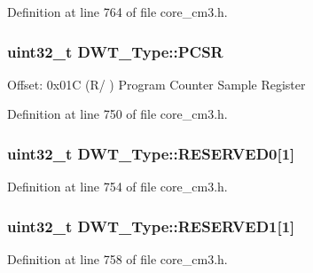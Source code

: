 Definition at line 764 of file core\+\_\+cm3.\+h.

\subsubsection[{\texorpdfstring{P\+C\+SR}{PCSR}}]{ uint32\+\_\+t D\+W\+T\+\_\+\+Type\+::\+P\+C\+SR}\hypertarget{structDWT__Type_abc5ae11d98da0ad5531a5e979a3c2ab5}{}\label{structDWT__Type_abc5ae11d98da0ad5531a5e979a3c2ab5}
Offset\+: 0x01C (R/ ) Program Counter Sample Register 

Definition at line 750 of file core\+\_\+cm3.\+h.

\subsubsection[{\texorpdfstring{R\+E\+S\+E\+R\+V\+E\+D0}{RESERVED0}}]{\setlength{\rightskip}{0pt plus 5cm}uint32\+\_\+t D\+W\+T\+\_\+\+Type\+::\+R\+E\+S\+E\+R\+V\+E\+D0\mbox{[}1\mbox{]}}\hypertarget{structDWT__Type_addd893d655ed90d40705b20170daac59}{}\label{structDWT__Type_addd893d655ed90d40705b20170daac59}


Definition at line 754 of file core\+\_\+cm3.\+h.

\subsubsection[{\texorpdfstring{R\+E\+S\+E\+R\+V\+E\+D1}{RESERVED1}}]{\setlength{\rightskip}{0pt plus 5cm}uint32\+\_\+t D\+W\+T\+\_\+\+Type\+::\+R\+E\+S\+E\+R\+V\+E\+D1\mbox{[}1\mbox{]}}\hypertarget{structDWT__Type_a069871233a8c1df03521e6d7094f1de4}{}\label{structDWT__Type_a069871233a8c1df03521e6d7094f1de4}


Definition at line 758 of file core\+\_\+cm3.\+h.

